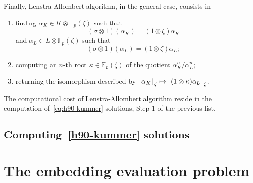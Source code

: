 Finally, Lenstra-Allombert algorithm, in the general case, consists in
\begin{enumerate}
  \item finding $\alpha_K\in K\otimes\mathbb{F}_p(\zeta)$ such that
    \[
      (\sigma\otimes1)(\alpha_K)=(1\otimes\zeta)\alpha_K
    \]
    and $\alpha_L\in L\otimes\mathbb{F}_p(\zeta)$ such that
    \[
      (\sigma\otimes1)(\alpha_L)=(1\otimes\zeta)\alpha_L;
    \]
  \item computing an $n$-th root $\kappa\in\mathbb{F}_p(\zeta)$ of the quotient
    $\alpha_K^n/\alpha_L^n$;
  \item returning the isomorphism described by
    $\left\lfloor \alpha_K \right\rfloor_{\zeta}\mapsto\left\lfloor (1\otimes\kappa)\alpha_L \right\rfloor_{\zeta}$.
\end{enumerate}
The computational cost of Lenstra-Allombert algorithm reside in the computation
of~\eqref{eq:h90-kummer} solutions, \ie Step $1$ of the previous list.

\subsection{Computing~\eqref{h90-kummer} solutions}

\section{The embedding evaluation problem}
\label{sec:evaluation}

